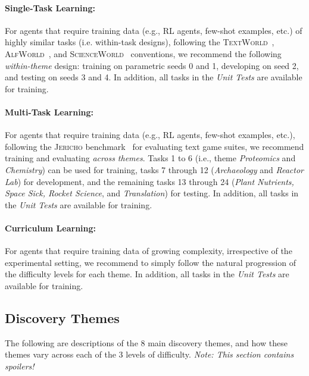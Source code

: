 \documentclass{article}
\begin{document}
\paragraph{Single-Task Learning:} For agents that require training data (e.g., RL agents, few-shot examples, etc.) of highly similar tasks (i.e. within-task designs), following the \textsc{TextWorld}~\citep{Ct2018TextWorldAL}, \textsc{AlfWorld}~\citep{Shridhar2020ALFWorldAT}, and \textsc{ScienceWorld}~\citep{wang2022scienceworld} conventions, we recommend the following \textit{within-theme} design: training on parametric seeds 0 and 1, developing on seed 2, and testing on seeds 3 and 4.  In addition, all tasks in the \textit{Unit Tests} are available for training.

\paragraph{Multi-Task Learning:} For agents that require training data (e.g., RL agents, few-shot examples, etc.), following the \textsc{Jericho} benchmark~\citep{Hausknecht2019InteractiveFG} for evaluating text game suites, we recommend training and evaluating \textit{across themes}.  Tasks 1 to 6 (i.e., theme \textit{Proteomics} and \textit{Chemistry}) can be used for training, tasks 7 through 12 (\textit{Archaeology} and \textit{Reactor Lab}) for development, and the remaining tasks 13 through 24 (\textit{Plant Nutrients, Space Sick, Rocket Science}, and \textit{Translation}) for testing.  In addition, all tasks in the \textit{Unit Tests} are available for training.

\paragraph{Curriculum Learning:} For agents that require training data of growing complexity, irrespective of the experimental setting, we recommend to simply follow the natural progression of the difficulty levels for each theme. In addition, all tasks in the \textit{Unit Tests} are available for training.



\subsection{Discovery Themes}
\label{sec:appendix-discovery-themes}

The following are descriptions of the 8 main discovery themes, and how these themes vary across each of the 3 levels of difficulty.  \textit{Note: This section contains spoilers!}
\end{document}
